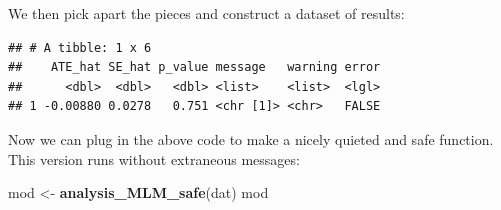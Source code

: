 \documentclass[
]{book}
\newenvironment{Shaded}{\begin{snugshade}}{\end{snugshade}}
\newcommand{\AttributeTok}[1]{\textcolor[rgb]{0.13,0.29,0.53}{#1}}
\newcommand{\CommentTok}[1]{\textcolor[rgb]{0.56,0.35,0.01}{\textit{#1}}}
\newcommand{\ConstantTok}[1]{\textcolor[rgb]{0.56,0.35,0.01}{#1}}
\newcommand{\ControlFlowTok}[1]{\textcolor[rgb]{0.13,0.29,0.53}{\textbf{#1}}}
\newcommand{\FunctionTok}[1]{\textcolor[rgb]{0.13,0.29,0.53}{\textbf{#1}}}
\newcommand{\NormalTok}[1]{#1}
\newcommand{\OtherTok}[1]{\textcolor[rgb]{0.56,0.35,0.01}{#1}}
\newcommand{\SpecialCharTok}[1]{\textcolor[rgb]{0.81,0.36,0.00}{\textbf{#1}}}
\newcommand{\StringTok}[1]{\textcolor[rgb]{0.31,0.60,0.02}{#1}}
\begin{document}
We then pick apart the pieces and construct a dataset of results:

\begin{Shaded}
\end{Shaded}

\begin{verbatim}
## # A tibble: 1 x 6
##    ATE_hat SE_hat p_value message   warning error
##      <dbl>  <dbl>   <dbl> <list>    <list>  <lgl>
## 1 -0.00880 0.0278   0.751 <chr [1]> <chr>   FALSE
\end{verbatim}

Now we can plug in the above code to make a nicely quieted and safe function.
This version runs without extraneous messages:

\begin{Shaded}
\begin{Highlighting}[]
\NormalTok{mod }\OtherTok{\textless{}{-}} \FunctionTok{analysis\_MLM\_safe}\NormalTok{(dat)}
\NormalTok{mod}
\end{Highlighting}
\end{Shaded}
\end{document}
